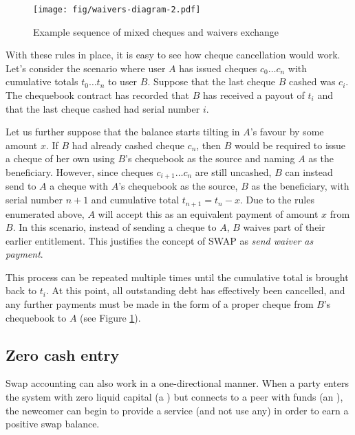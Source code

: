 \begin{figure}[htbp]
\centering
\texttt{[image: fig/waivers-diagram-2.pdf]}
\caption[Example sequence of mixed cheques and waivers exchange \statusgreen]{Example sequence of mixed cheques and waivers exchange}
\label{fig:waivers-diagram}
\end{figure}

With these rules in place, it is easy to see how cheque cancellation would work. Let's consider the scenario where user $A$ has issued cheques $c_0 \ldots c_n$ with cumulative totals $t_0 \ldots t_n$ to user $B$. Suppose that the last cheque $B$ cashed was $c_i$. The chequebook contract has recorded that $B$ has received a payout of $t_i$ and that the last cheque cashed had serial number $i$.

Let us further suppose that the balance starts tilting in $A$'s favour by some amount $x$. If $B$ had already cashed cheque $c_n$, then $B$ would be required to issue a cheque of her own using $B$'s chequebook as the source and naming $A$ as the beneficiary. However, since cheques $c_{i+1} \ldots c_n$  are still uncashed, $B$ can instead send to $A$ a cheque with $A$'s chequebook as the source, $B$ as the beneficiary, with serial number $n+1$ and cumulative total $t_{n+1} = t_n - x$. Due to the rules enumerated above, $A$ will accept this as an equivalent payment of amount $x$ from $B$.  In this scenario, instead of sending a cheque to $A$, $B$ waives part of their earlier entitlement. This justifies the concept of SWAP as \emph{send waiver as payment}.

This process can be repeated multiple times until the cumulative total is brought back to $t_i$. At this point, all outstanding debt has effectively been cancelled, and any further payments must be made in the form of a proper cheque from $B$'s chequebook to $A$ (see Figure \ref{fig:waivers-diagram}).



\subsection{Zero cash entry\statusgreen}\label{sec:zero-cash-entry}


Swap accounting can also work in a one-directional manner. When a party enters the system with zero liquid capital (a ) but connects to a peer with funds (an ), the newcomer can begin to provide a service (and not use any) in order to earn a positive swap balance. 

